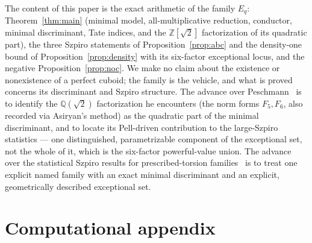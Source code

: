 \documentclass[11pt,reqno]{amsart}
\theoremstyle{plain}
\theoremstyle{definition}
\newcommand{\Q}{\mathbb{Q}}
\newcommand{\Z}{\mathbb{Z}}
\begin{document}
The content of this paper is the exact arithmetic of the family $E_q$:
Theorem~\ref{thm:main} (minimal model, all-multiplicative reduction, conductor,
minimal discriminant, Tate indices, and the $\Z[\sqrt2]$ factorization of its
quadratic part), the three
Szpiro statements of Proposition~\ref{prop:abc} and the density-one bound of
Proposition~\ref{prop:density} with its six-factor exceptional locus, and the
negative Proposition~\ref{prop:noc}. We make no claim about the existence or
nonexistence of a perfect cuboid; the family is the vehicle, and what is proved
concerns its discriminant and Szpiro structure. The advance over
Peschmann~\cite{peschmann} is to identify the $\Q(\sqrt2)$ factorization he
encounters (the norm forms $F_5,F_6$, also recorded via Asiryan's method) as the
quadratic part of the minimal discriminant, and to locate its Pell-driven
contribution to the large-Szpiro statistics --- one distinguished, parametrizable
component of the exceptional set, not the whole of it, which is the six-factor
powerful-value union. The advance over the statistical Szpiro results
for prescribed-torsion families~\cite{chan} is to treat one explicit named family
with an exact minimal discriminant and an explicit, geometrically described
exceptional set.

\section{Computational appendix}
\end{document}
